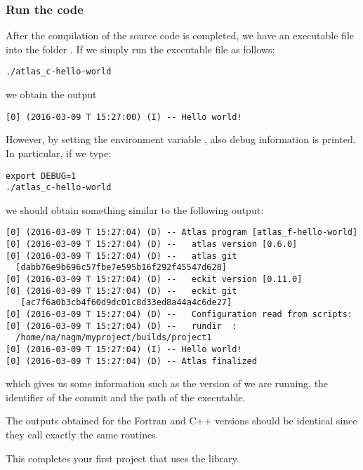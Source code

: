 \subsubsection*{Run the code}
After the compilation of the source code is completed, 
we have an executable file into the folder .
If we simply run the executable file as follows:
%
\begin{lstlisting}[style=BashStyle]
./atlas_c-hello-world
\end{lstlisting}
% 
we obtain the output
\begin{lstlisting}[style=BashStyle]
[0] (2016-03-09 T 15:27:00) (I) -- Hello world!
\end{lstlisting}
%
However, by setting the environment variable ,
also debug information is printed.
In particular, if we type:
%
\begin{lstlisting}[style=BashStyle]
export DEBUG=1
./atlas_c-hello-world
\end{lstlisting}
%
we should obtain something similar to the following output:
%
\begin{lstlisting}[style=BashStyle]
[0] (2016-03-09 T 15:27:04) (D) -- Atlas program [atlas_f-hello-world]
[0] (2016-03-09 T 15:27:04) (D) --   atlas version [0.6.0]
[0] (2016-03-09 T 15:27:04) (D) --   atlas git     
  [dabb76e9b696c57fbe7e595b16f292f45547d628]
[0] (2016-03-09 T 15:27:04) (D) --   eckit version [0.11.0]
[0] (2016-03-09 T 15:27:04) (D) --   eckit git    
   [ac7f6a0b3cb4f60d9dc01c8d33ed8a44a4c6de27]
[0] (2016-03-09 T 15:27:04) (D) --   Configuration read from scripts:
[0] (2016-03-09 T 15:27:04) (D) --   rundir  :
  /home/na/nagm/myproject/builds/project1
[0] (2016-03-09 T 15:27:04) (I) -- Hello world!
[0] (2016-03-09 T 15:27:04) (D) -- Atlas finalized

\end{lstlisting}
%
which gives us some information such as the version of \Atlas we are 
running, the identifier of the commit and the path of the executable. 
\begin{tipbox}
The outputs obtained for the Fortran and C++ versions should be identical
since they call exactly the same routines. 
\end{tipbox}

This completes your first project that uses the \Atlas library.






